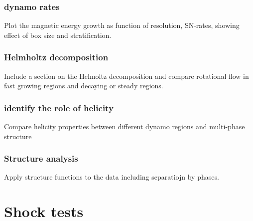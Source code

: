 \documentclass[preprint2]{aastex63}
\begin{document}
\subsubsection{dynamo rates}
Plot the magnetic energy growth as function of resolution, SN-rates, showing
effect of box size and stratification.

\subsubsection{Helmholtz decomposition}
Include a section on the Helmoltz decomposition and compare rotational flow
in fast growing regions and decaying or steady regions. 

\subsubsection{identify the role of helicity}
Compare helicity properties between different dynamo regions and multi-phase
structure

\subsubsection{Structure analysis}
Apply structure functions to the data including separatiojn by phases.

\section[]{Shock tests}
\label{sect:shocks}
\end{document}
